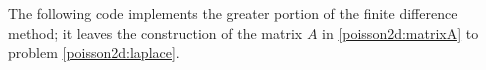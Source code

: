 The following code implements the greater portion of the finite difference method; it leaves the construction of the matrix $A$ in \eqref{poisson2d:matrixA} to problem \ref{poisson2d:laplace}.

